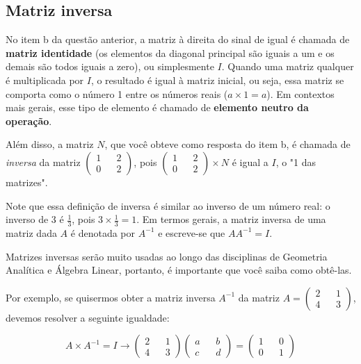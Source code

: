 \documentclass[main.tex]{subfiles}
\begin{document}
\subsection*{Matriz inversa}

No item b da questão anterior, a matriz à direita do sinal de igual é chamada de \textbf{matriz identidade} (os elementos da diagonal principal são iguais a um e os demais são todos iguais a zero), ou simplesmente $I$. Quando uma matriz qualquer é multiplicada por $I$, o resultado é igual à matriz inicial, ou seja, essa matriz se comporta como o número 1 entre os números reais ($a \times 1 = a$). Em contextos mais gerais, esse tipo de elemento é chamado de \textbf{elemento neutro da operação}.

Além disso, a matriz $N$, que você obteve como resposta do item b, é chamada de {\em inversa} da matriz $ \begin{pmatrix} 1 && 2 \\ 0 && 2 \end{pmatrix}$, pois $\begin{pmatrix} 1 && 2 \\ 0 && 2 \end{pmatrix} \times N$ é igual a $I$, o "1 das matrizes".

Note que essa definição de inversa é similar ao inverso de um número real: o inverso de 3 é $\frac{1}{3}$, pois $3 \times \frac{1}{3} = 1$. Em termos gerais, a matriz inversa de uma matriz dada $A$ é denotada por $A^{-1}$ e escreve-se que $AA^{-1}=I$.

Matrizes inversas serão muito usadas ao longo das disciplinas de Geometria Analítica e Álgebra Linear, portanto, é importante que você saiba como obtê-las.

Por exemplo, se quisermos obter a matriz inversa $A^{-1}$ da matriz $A=\begin{pmatrix} 2 && 1 \\ 4 && 3 \end{pmatrix}$, devemos resolver a seguinte igualdade:


\begin{equation*}
 A \times A^{-1}=I \longrightarrow \begin{pmatrix} 2 && 1 \\ 4 && 3 \end{pmatrix} \begin{pmatrix} a && b \\ c && d \end{pmatrix} = \begin{pmatrix} 1 && 0 \\ 0 && 1 \end{pmatrix}
\end{equation*}
\end{document}
